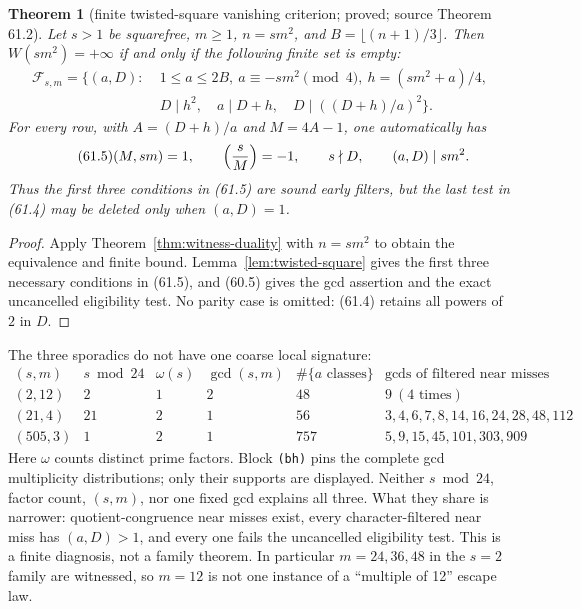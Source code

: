 \documentclass[10pt,reqno]{amsart}
\newtheorem{theorem}{Theorem}[section]
\theoremstyle{definition}
\newcommand{\1}{\mathbf 1}
\begin{document}
\begin{theorem}[finite twisted-square vanishing criterion; proved; source
Theorem 61.2]
\label{thm:twisted-square-criterion}
Let $s>1$ be squarefree, $m\geq1$, $n=sm^2$, and
$B=\lfloor(n+1)/3\rfloor$.  Then $W(sm^2)=+\infty$ if and only if the
following finite set is empty:
\begin{equation}\tag{61.4}
 \begin{split}
 \mathcal F_{s,m}=\{(a,D):\;&1\leq a\leq2B,
     \ a\equiv-sm^2\pmod4,
     \ h=(sm^2+a)/4,\\
   &D\mid h^2,\quad a\mid D+h,\quad
     D\mid((D+h)/a)^2\}.
 \end{split}
\end{equation}
For every row, with $A=(D+h)/a$ and $M=4A-1$, one automatically has
\begin{equation}\tag{61.5}
 (M,sm)=1,
 \qquad \left({s\over M}\right)=-1,
 \qquad s\nmid D,
 \qquad (a,D)\mid sm^2.
\end{equation}
Thus the first three conditions in (61.5) are sound early filters, but the
last test in (61.4) may be deleted only when $(a,D)=1$.
\end{theorem}
\begin{proof}
Apply Theorem~\ref{thm:witness-duality} with $n=sm^2$ to obtain the
equivalence and finite bound.  Lemma~\ref{lem:twisted-square} gives the first three necessary
conditions in (61.5), and (60.5) gives the gcd assertion and the exact
uncancelled eligibility test.  No parity case is omitted: (61.4) retains all
powers of $2$ in $D$.
\end{proof}

The three sporadics do not have one coarse local signature:
\begingroup\scriptsize
\begin{equation}\tag{61.6}
\begin{array}{c|c|c|c|c|l}
(s,m)&s\bmod24&\omega(s)&\gcd(s,m)&\#\{a\text{ classes}\}&
 \text{gcds of filtered near misses}\\ \hline
(2,12)&2&1&2&48&9\ (4\text{ times})\\
(21,4)&21&2&1&56&3,4,6,7,8,14,16,24,28,48,112\\
(505,3)&1&2&1&757&5,9,15,45,101,303,909
\end{array}
\end{equation}
\endgroup
Here $\omega$ counts distinct prime factors.  Block \texttt{(bh)} pins the
complete gcd multiplicity distributions; only their supports are displayed.
Neither $s\bmod24$, factor count, $(s,m)$, nor one fixed gcd explains all
three.  What they share is narrower: quotient-congruence near misses exist,
every character-filtered near miss has $(a,D)>1$, and every one fails the
uncancelled eligibility test.  This is a finite diagnosis, not a family
theorem.  In particular $m=24,36,48$ in the $s=2$ family are witnessed, so
$m=12$ is not one instance of a ``multiple of 12'' escape law.
\end{document}
